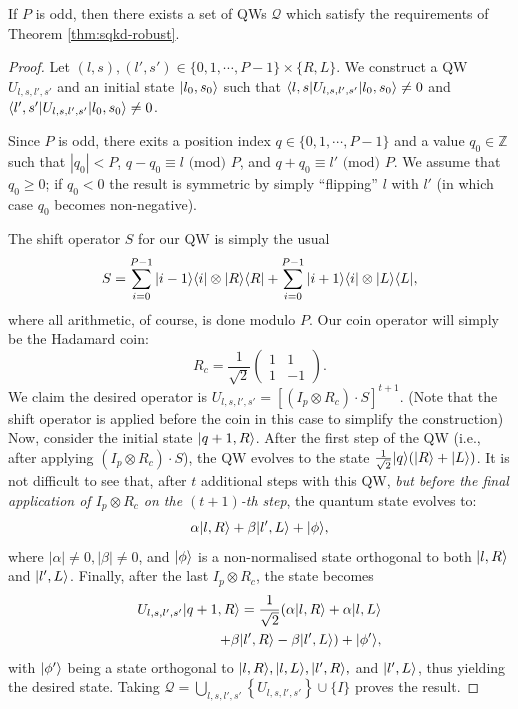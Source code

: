 \begin{lemma}
If $P$ is odd, then there exists a set of QWs $\mathcal{Q}$ which satisfy the requirements of Theorem \ref{thm:sqkd-robust}.
\end{lemma}
\begin{proof}
Let $(l,s),(l',s') \in \{0,1,\cdots, P-1\}\times\{R,L\}$.  We construct a QW $U_{l,s,l',s'}$ and an initial state $| l_0,s_0 \rangle$ such that $\braket{l,s|U_{l,s,l',s'}|l_0,s_0} \ne 0$ and $\braket{l',s'|U_{l,s,l',s'}|l_0,s_0} \ne 0$.

Since $P$ is odd, there exits a position index $q \in \{0,1,\cdots,P-1\}$ and a value $q_0 \in \mathbb{Z}$ such that $|q_0| < P$, $q-q_0 \equiv l \text{ (mod) } P$, and $q+q_0\equiv l' \text{ (mod) } P$.  We assume that $q_0 \ge 0$; if $q_0 < 0$ the result is symmetric by simply ``flipping'' $l$ with $l'$ (in which case $q_0$ becomes non-negative).

The shift operator $S$ for our QW is simply the usual
\[
S = \sum_{i=0}^{P-1}| i-1 \rangle\langle i |\otimes | R \rangle\langle R | + \sum_{i=0}^{P-1}| i+1 \rangle\langle i | \otimes | L \rangle\langle L |,
\]
where all arithmetic, of course, is done modulo $P$.  Our coin operator will simply be the Hadamard coin:
\[
R_c = \frac{1}{\sqrt{2}}\left(
\begin{array}{cc}
1&1\\
1&-1
\end{array}\right).
\]
We claim the desired operator is $U_{l,s,l',s'} = \left[ ( I_p\otimes R_c)\cdot S\right]^{t+1}$. (Note that the shift operator is applied before the coin in this case to simplify the construction) Now, consider the initial state $| q+1,R \rangle$.  After the first step of the QW (i.e., after applying $(I_p\otimes R_c)\cdot S$), the QW evolves to the state $\frac{1}{\sqrt{2}}| q \rangle(| R \rangle+| L \rangle)$.  It is not difficult to see that, after $t$ additional steps with this QW, \emph{but before the final application of $I_p\otimes R_c$ on the $(t+1)$-th step}, the quantum state evolves to:
\[
\alpha| l,R \rangle + \beta| l',L \rangle + | \phi \rangle,
\]
where $|\alpha| \ne 0, |\beta| \ne 0$, and $| \phi \rangle$ is a non-normalised state orthogonal to both $| l,R \rangle$ and $| l',L \rangle$.  Finally, after the last $I_p\otimes R_c$, the state becomes
\begin{eqnarray*}
U_{l,s,l',s'}| q+1,R \rangle = \frac{1}{\sqrt{2}}(\alpha| l,R \rangle + \alpha| l,L \rangle \\+ \beta| l',R \rangle - \beta| l',L \rangle) + | \phi' \rangle,
\end{eqnarray*}
with $| \phi' \rangle$ being a state orthogonal to $| l,R \rangle, | l,L \rangle, | l',R \rangle,$ and $| l',L \rangle$, thus yielding the desired state.  Taking $\mathcal{Q} = \bigcup_{l,s,l',s'}\left\{U_{l,s,l',s'}\right\} \cup \{I\}$ proves the result.
\end{proof}

